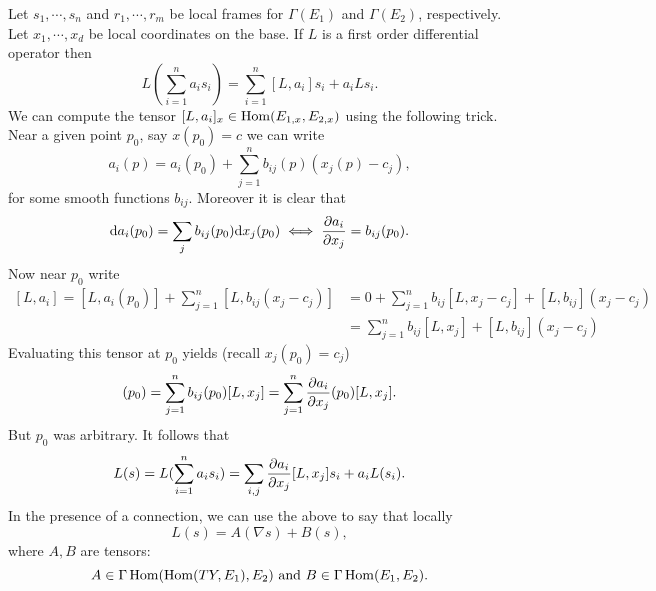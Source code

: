 \begin{example}
  Let $s_{1},\cdots,s_{n}$ and $r_{1},\cdots,r_{m}$ be local frames for $\Gamma(E_{1})$ and $\Gamma(E_{2})$, respectively. Let $x_{1},\cdots,x_{d}$ be local coordinates on the base. If $L$ is a first order differential operator then
  \begin{equation*}
    L(\sum_{i=1}^{n}a_{i}s_{i})=\sum_{i=1}^{n}[L,a_{i}]s_{i}+a_{i}Ls_{i}.
  \end{equation*}
  We can compute the tensor $[L,a_{i}]_{x}\in \operatorname{\mathrm{Hom}}(E_{1,x},E_{2,x})$ using the following trick. Near a given point $p_{0}$, say $x(p_{0})=c$ we can write
  \begin{equation*}
    a_{i}(p)=a_{i}(p_{0})+\sum_{j=1}^{n}b_{ij}(p)(x_{j}(p)-c_{j}),
  \end{equation*}
  for some smooth functions $b_{ij}$. Moreover it is clear that
  \begin{equation*}
    \mathrm{d} a_{i}(p_{0})=\sum_{j}b_{ij}(p_{0})\mathrm{d} x_{j}(p_{0})\iff \frac{\partial a_{i}}{\partial x_{j}}=b_{ij}(p_{0}).
  \end{equation*}
  Now near $p_{0}$ write
  \begin{equation*}
    \begin{aligned}
      [L,a_{i}]=[L,a_{i}(p_{0})]+\sum_{j=1}^{n}[L,b_{ij}(x_{j}-c_{j})]&=0+\sum_{j=1}^{n}b_{ij}[L,x_{j}-c_{j}]+[L,b_{ij}](x_{j}-c_{j})\\
      &=\sum_{j=1}^{n}b_{ij}[L,x_{j}]+[L,b_{ij}](x_{j}-c_{j})
    \end{aligned}
      \end{equation*}
  Evaluating this tensor at $p_{0}$ yields (recall $x_{j}(p_{0})=c_{j}$) 
  \begin{equation*}
    [L,a_{i}](p_{0})=\sum_{j=1}^{n}b_{ij}(p_{0})[L,x_{j}]=\sum_{j=1}^{n}\pd{a_{i}}{x_{j}}(p_{0})[L,x_{j}].
  \end{equation*}
  But $p_{0}$ was arbitrary. It follows that
  \begin{equation*}
    L(s)=L(\sum_{i=1}^{n}a_{i}s_{i})=\sum_{i,j}\frac{\partial a_{i}}{\partial x_{j}}[L,x_{j}]s_{i}+a_{i}L(s_{i}).
  \end{equation*}
  In the presence of a connection, we can use the above to say that locally
  \begin{equation*}
    L(s)=A(\nabla s)+B(s),
  \end{equation*}
  where $A,B$ are tensors:
  \begin{equation*}
    A\in \Gamma \operatorname{\mathrm{Hom}}(\operatorname{\mathrm{Hom}}(TY,E_{1}),E_{2}) \text{ and }B\in \Gamma\operatorname{\mathrm{Hom}}(E_{1},E_{2}).
  \end{equation*}

\end{example}
